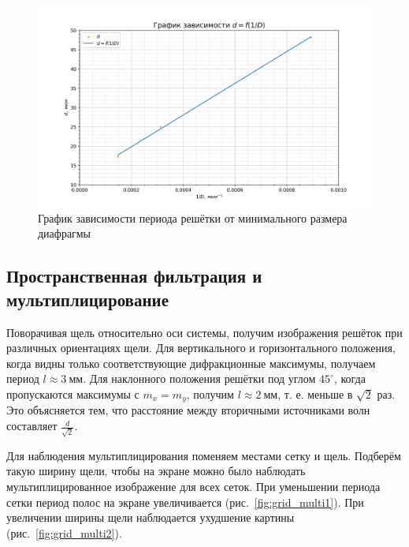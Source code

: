 \documentclass[a4paper, 12pt]{article}
\begin{document}
\begin{figure}[h!]
\begin{center}
    \includegraphics[scale=0.7]{4.3.3_1.png}
\end{center}
\caption{График зависимости периода решётки от минимального размера диафрагмы}
\label{plot:Abbe}
\end{figure}

\newpage

\subsection{Пространственная фильтрация и мультиплицирование}

Поворачивая щель относительно оси системы, получим изображения решёток при различных ориентациях щели. Для вертикального и горизонтального положения, когда видны только соответствующие дифракционные максимумы, получаем период $l \approx 3~мм$. Для наклонного положения решётки под углом $45^{\circ}$, когда пропускаются максимумы с $m_x = m_y$, получим $l \approx 2~мм$, т. е. меньше в $\sqrt{2}$ раз. Это объясняется тем, что расстояние между вторичными источниками волн составляет $\frac{d}{\sqrt{2}}$.

Для наблюдения мультиплицирования поменяем местами сетку и щель. Подберём такую ширину щели, чтобы на экране можно было наблюдать мультиплицированное изображение для всех сеток. При уменьшении периода сетки период полос на экране увеличивается (рис.~\ref{fig:grid_multi1}). При увеличении ширины щели наблюдается ухудшение картины (рис.~\ref{fig:grid_multi2}).
\end{document}
